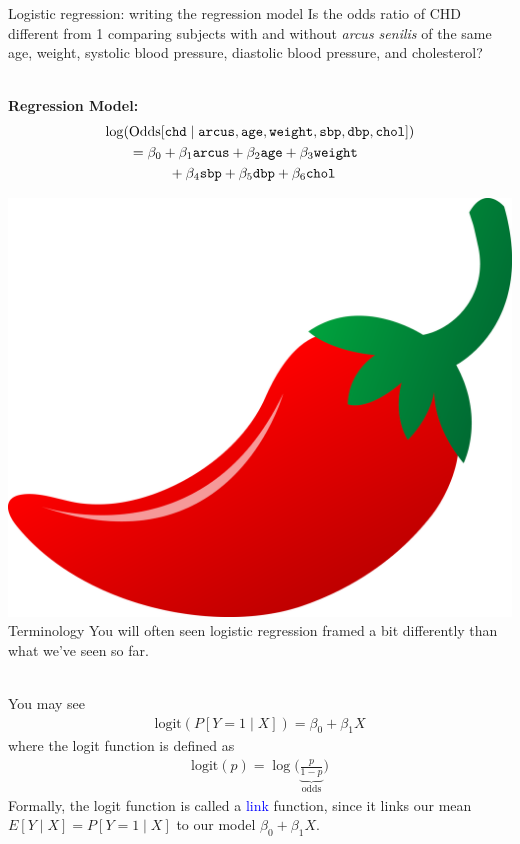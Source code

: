 \documentclass[10pt,t]{beamer}
\newcommand\tab[1][1cm]{\hspace*{#1}}
\begin{document}
\begin{frame}{Logistic regression: writing the regression model}
	Is the odds ratio of CHD different from 1 comparing subjects with and without \textit{arcus senilis} of the same age, weight, systolic blood pressure, diastolic blood pressure, and cholesterol? 
	\\ ~\ 
	
	\textbf{Regression Model:} \pause
	\begin{align*}
		\log(&\text{Odds}[\texttt{chd} \mid \texttt{arcus}, \texttt{age}, \texttt{weight}, \texttt{sbp}, \texttt{dbp}, \texttt{chol}]) \\
		&= \beta_0 + \beta_1\texttt{arcus} + \beta_2\texttt{age} + \beta_3\texttt{weight} \\
		&\tab + \beta_4\texttt{sbp} + \beta_5\texttt{dbp} + \beta_6\texttt{chol}
	\end{align*}
\end{frame}

\begin{frame}{\includegraphics[scale=0.01]{./figs/chilipepper} Terminology}
	You will often seen logistic regression framed a bit differently than what we've seen so far. \pause
	\\ ~\ 
	
	You may see
	\begin{align*}
		\text{logit}(P[Y = 1 \mid X]) = \beta_0 + \beta_1 X
	\end{align*}
where the logit function is defined as \pause
\begin{align*}
	\text{logit}(p) = \log\Big(\underbrace{\frac{p}{1-p}}_{\text{odds}}\Big)
\end{align*}
\pause
Formally, the logit function is called a \textcolor{blue}{link} function, since it links our mean $E[Y \mid X] = P[Y = 1 \mid X]$ to our model $\beta_0 + \beta_1 X$. 
\end{frame}
\end{document}
